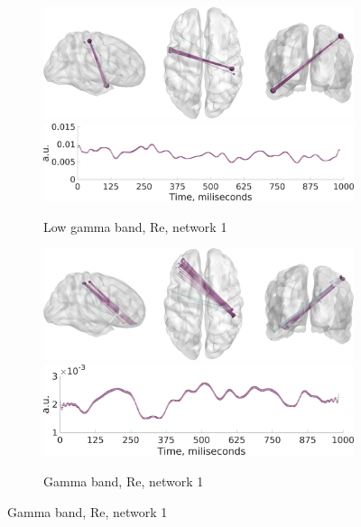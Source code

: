 \begin{figure}
\centering
{}

 \begin{subfigure}[b]{0.4\textwidth}
 \includegraphics[width=\textwidth]{../images/psiicos_paper/Figure13_a1.jpg}
 \includegraphics[width=\textwidth]{../images/psiicos_paper/Figure13_a2.jpg}
 \caption{Low gamma band, Re, network 1}\label{fig:13a}
 \end{subfigure}
 \hspace{1cm}
 \begin{subfigure}[b]{0.4\textwidth}
 \includegraphics[width=\textwidth]{../images/psiicos_paper/Figure13_b1.jpg}
 \includegraphics[width=\textwidth]{../images/psiicos_paper/Figure13_b2.jpg}
 \caption{Gamma band, Re, network 1}\label{fig:13b}
 \end{subfigure}


\end{figure}
